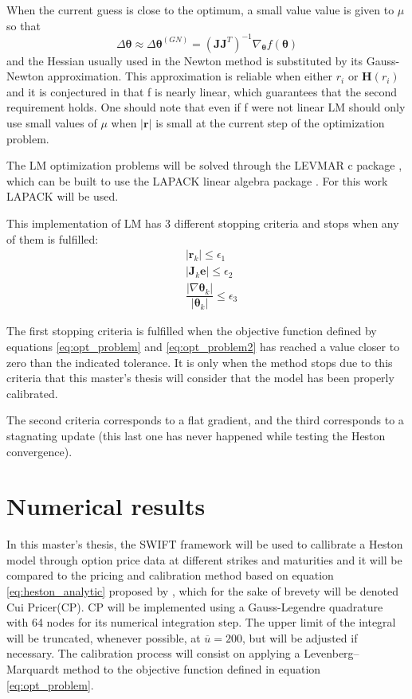 \documentclass[12,twoside]{mammeTFM}
\theoremstyle{definition}
\theoremstyle{remark}
\begin{document}
When the current guess is close to the optimum, a small value value is given to $\mu$ so that
\begin{equation}
\Delta \boldsymbol{\theta} \approx \Delta \boldsymbol{\theta}^{(GN)} = (\boldsymbol{J}\boldsymbol{J}^{T})^{-1} \nabla_{\boldsymbol{\theta}} f(\boldsymbol{\theta})
\end{equation}
and the Hessian usually used in the Newton method is substituted by its Gauss-Newton approximation. This approximation is reliable when either $r_i$ or $\boldsymbol{H}(r_i)$ and it is conjectured in \cite{cui17} that f is nearly linear, which guarantees that the second requirement holds. One should note that even if f were not linear LM should only use small values of $\mu$ when $|\boldsymbol{r}|$ is small at the current step of the optimization problem.

The LM optimization problems will be solved through the LEVMAR c package \cite{levmar}, which can be built to use the LAPACK linear algebra package \cite{lapack}. For this work LAPACK will be used.

This implementation of LM has 3 different stopping criteria and stops when any of them is fulfilled:
\begin{align}
&|\boldsymbol{r}_k| \leq \epsilon_1 \\
&|\boldsymbol{J}_k\boldsymbol{e}| \leq \epsilon_2 \\
&\dfrac{|\nabla \boldsymbol{\theta}_k|}{|\boldsymbol{\theta}_k|} \leq \epsilon_3
\end{align}

The first stopping criteria is fulfilled when the objective function defined by equations \ref{eq:opt_problem} and \ref{eq:opt_problem2} has reached a value closer to zero than the indicated tolerance. It is only when the method stops due to this criteria that this master's thesis will consider that the model has been properly calibrated.

The second criteria corresponds to a flat gradient, and the third corresponds to a stagnating update (this last one has never happened while testing the Heston convergence).

\section{Numerical results} \label{chapter:study}

In this master's thesis, the SWIFT framework will be used to callibrate a Heston model through option price data at different strikes and maturities and it will be compared to the pricing and calibration method based on equation \ref{eq:heston_analytic} proposed by \cite{cui17}, which for the sake of brevety will be denoted Cui Pricer(CP). CP will be implemented using a Gauss-Legendre quadrature with 64 nodes for its numerical integration step. The upper limit of the integral will be truncated, whenever possible, at $\overline{u} = 200$, but will be adjusted if necessary. The calibration process will consist on applying a Levenberg–Marquardt method to the objective function defined in equation \ref{eq:opt_problem}.
\end{document}
